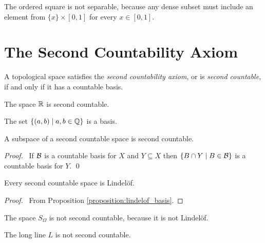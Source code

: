 \begin{example}
    The ordered square is not separable, because any dense subset must include
    an element from $\{x\} \times [0,1]$ for every $x \in [0,1]$.
\end{example}

\section{The Second Countability Axiom}

\begin{definition}
    A topological space satisfies the \emph{second countability axiom},
    or is \emph{second countable}, if and only if it has a countable basis.    
\end{definition}

\begin{example}
    The space $\mathbb{R}$ is second countable.

    The set $\{ (a,b) \mid a,b \in \mathbb{Q} \}$ is a basis.
\end{example}

\begin{proposition}
    \label{proposition:second_countable_subspace}
    A subspace of a second countable space is second countable.
\end{proposition}

\begin{proof}
    \pf\ If $\mathcal{B}$ is a countable basis for $X$ and $Y \subseteq X$
    then $\{ B \cap Y \mid B \in \mathcal{B} \}$ is a countable basis for $Y$. \qed
\end{proof}

\begin{proposition}[CC]
    \label{proposition:lindelof_second_countable}
    Every second countable space is Lindel\"{o}f.
\end{proposition}

\begin{proof}
    \pf\ From Proposition \ref{proposition:lindelof_basis}.
\end{proof}

\begin{example}
    The space $S_\Omega$ is not second countable, because it is not Lindel\"{o}f.
\end{example}

\begin{proposition}
    The long line $L$ is not second countable.
\end{proposition}

